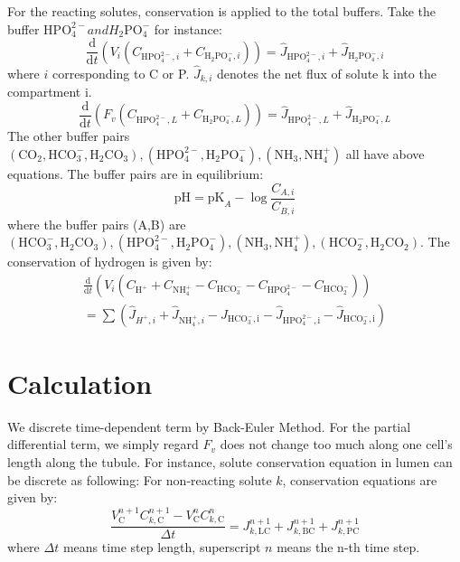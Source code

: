 \documentclass{article}
\begin{document}
For the reacting solutes, conservation is applied to the total buffers. Take the buffer $\mathrm{HPO}_{4}^{2-} and {H}_{2} \mathrm{PO}_{4}^{-}$ for instance:
\begin{equation}
\frac{\mathrm{d}}{\mathrm{d} t}\left(V_{i}\left(C_{\mathrm{HPO}_{4}^{2-}, i}+C_{\mathrm{H}_{2} \mathrm{PO}_{4}^{-}, i}\right)\right)=\hat{J}_{\mathrm{HPO}_{4}^{2-}, i}+\hat{J}_{\mathrm{H}_{2} \mathrm{PO}_{4}^{-}, i}
\end{equation}
where $i$ corresponding to C or P. $\hat{J}_{k, i}$ denotes the net flux of solute k into the compartment i.
\begin{equation}
\frac{\mathrm{d}}{\mathrm{d} t}\left(F_{v}\left(C_{\mathrm{HPO}_{4}^{2-}, L}+C_{\mathrm{H}_{2} \mathrm{PO}_{4}^{-}, L}\right)\right)=\hat{J}_{\mathrm{HPO}_{4}^{2-}, L}+\hat{J}_{\mathrm{H}_{2} \mathrm{PO}_{4}^{-}, L}
\end{equation}
The other buffer pairs $\left(\mathrm{CO}_{2},\mathrm{HCO}_{3}^{-}, \mathrm{H}_{2} \mathrm{CO}_{3}\right),\left(\mathrm{HPO}_{4}^{2-}, \mathrm{H}_{2} \mathrm{PO}_{4}^{-}\right),\left(\mathrm{NH}_{3}, \mathrm{NH}_{4}^{+}\right)$ all have above equations.
The buffer pairs are in equilibrium:
\begin{equation}
\mathrm{pH}=\mathrm{pK}_{A}-\log \frac{C_{A, i}}{C_{B, i}}
\end{equation}
where the buffer pairs (A,B) are $\left(\mathrm{HCO}_{3}^{-}, \mathrm{H}_{2} \mathrm{CO}_{3}\right),\left(\mathrm{HPO}_{4}^{2-}, \mathrm{H}_{2} \mathrm{PO}_{4}^{-}\right),\left(\mathrm{NH}_{3}, \mathrm{NH}_{4}^{+}\right),\left(\mathrm{HCO}_{2}^{-}, \mathrm{H}_{2} \mathrm{CO}_{2}\right)$.
The conservation of hydrogen is given by:
\begin{equation}
\begin{aligned}
\frac{\mathrm{d}}{\mathrm{d} t}\left(V_{i} (C_{\mathrm{H}^{+}}+C_{\mathrm{NH}_{4}^{+}}-C_{\mathrm{HCO_{3}^{-}}}-C_{\mathrm{HPO_{4}^{2-}}}-C_{\mathrm{HCO_{2}^{-}}}) \right)\\=\sum (\hat{J}_{H^{+}, i}+\hat{J}_{\mathrm{NH}_{4}^{+}, i}-\hat{J}_{ \mathrm{HCO_{3}^{-}, i}}-\hat{J}_{ \mathrm{HPO_{4}^{2-}, i}}-\hat{J}_{ \mathrm{HCO_{2}^{-}, i}})
\end{aligned}
\end{equation}

\section{Calculation}
We discrete time-dependent term by Back-Euler Method. For the partial differential term, we simply regard $F_{v}$ does not change too much along one cell's length along the tubule. For instance, solute conservation equation in lumen can be discrete as following:
For non-reacting solute $k$, conservation equations are given by:
\begin{equation}
\frac{V_{\mathrm{C}}^{n+1} C_{k, \mathrm{C}}^{n+1}-V_{\mathrm{C}}^{n} C_{k, \mathrm{C}}^{n}}{\Delta t}=J_{k, \mathrm{LC}}^{n+1}+J_{k, \mathrm{BC}}^{n+1}+J_{k, \mathrm{PC}}^{n+1}
\end{equation}
where ${\Delta t}$ means time step length, superscript $n$ means the n-th time step.
\end{document}
